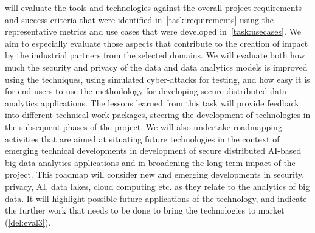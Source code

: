 \begin{Workpackage}{\thewpno}
\begin{Task}
\TaskResults{%
\ref{del:eval1},
\ref{del:eval2},
\ref{del:eval3}
}
\TaskHeader{}
\theTask{} will evaluate the \TheProject{} tools and technologies against the overall project requirements and success criteria that were identified in~\ref{task:requirements} using the representative metrics and use cases that were developed in~\ref{task:usecases}. We aim to especially evaluate those aspects that contribute to the creation of impact by the industrial partners from the selected domains. We will evaluate both how much the security and privacy of the data and data analytics models is improved using the \TheProject{} techniques, using simulated cyber-attacks for testing, and how easy it is for end users to use the \TheProject{} methodology for developing secure distributed data analytics applications. The lessons learned from this task will provide feedback into different technical work packages, steering the development of \TheProject{} technologies in the subsequent phases of the project. We will also undertake roadmapping activities that are aimed at situating future \TheProject{} technologies in the context of emerging technical developments in development of secure distributed AI-based big data analytics applications and in broadening the long-term impact of the \TheProject{} project. This roadmap will consider new and emerging developments in security, privacy, AI, data lakes, cloud computing etc. as they relate to the analytics of big data. It will highlight possible future applications of the \TheProject{} technology, and indicate the further work that needs to be done to bring the \TheProject{} technologies to market (\ref{del:eval3}). 
  \end{Task}
  

%  


\end{Workpackage}
